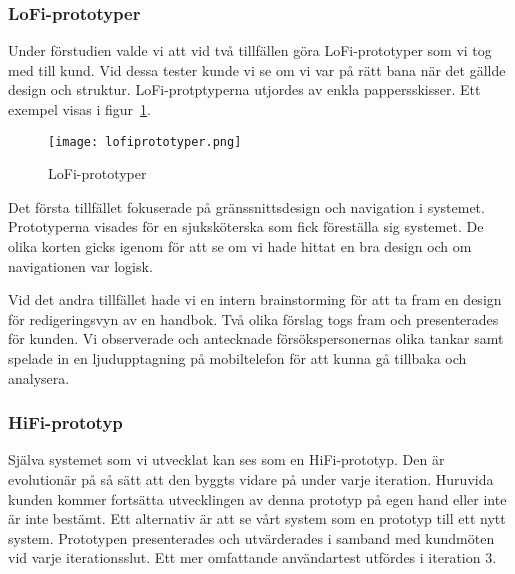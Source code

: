 \subsubsection{LoFi-prototyper}
Under förstudien valde vi att vid två tillfällen göra LoFi-prototyper som vi tog med till kund. Vid dessa tester kunde vi se om vi var på rätt bana när det gällde design och struktur. LoFi-protptyperna utjordes av enkla pappersskisser. Ett exempel visas i figur~\ref{fig:lofiprototyper}.
\begin{figure}[htbp]
\begin{center}
\texttt{[image: lofiprototyper.png]}
\caption{LoFi-prototyper}
\label{fig:lofiprototyper}
\end{center}
\end{figure}
Det första tillfället fokuserade på gränssnittsdesign och navigation i systemet. Prototyperna visades för en sjuksköterska som fick föreställa sig systemet. De olika korten gicks igenom för att se om vi hade hittat en bra design och om navigationen var logisk.

Vid det andra tillfället hade vi en intern brainstorming för att ta fram en design för redigeringsvyn av en handbok. Två olika förslag togs fram och presenterades för kunden. Vi observerade och antecknade försökspersonernas olika tankar samt spelade in en ljudupptagning på mobiltelefon för att kunna gå tillbaka och analysera.
\subsubsection{HiFi-prototyp}
Själva systemet som vi utvecklat kan ses som en HiFi-prototyp. Den är evolutionär på så sätt att den byggts vidare på under varje iteration. Huruvida kunden kommer fortsätta utvecklingen av denna prototyp på egen hand eller inte är inte bestämt. Ett alternativ är att se vårt system som en prototyp till ett nytt system. 
Prototypen presenterades och utvärderades i samband med kundmöten vid varje iterationsslut. Ett mer omfattande användartest utfördes i iteration 3.



